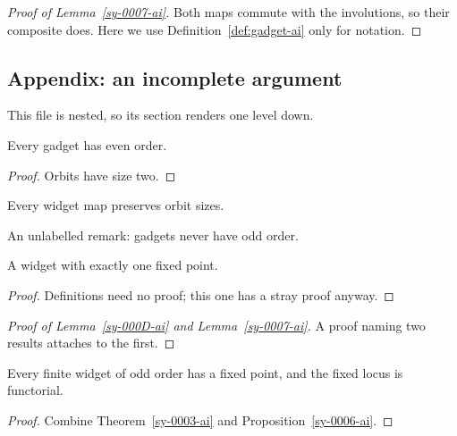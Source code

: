 \begin{proof}[Proof of Lemma~\ref{sy-0007-ai}]
Both maps commute with the involutions, so their composite does. Here we use Definition~\ref{def:gadget-ai} only for notation.
\end{proof}



\subsection{Appendix: an incomplete argument}\label{sy-0300-ai}

This file is nested, so its section renders one level down.

\begin{lemma}[Incomplete]\label{sy-000C-ai}
Every gadget has even order.
\end{lemma}
\begin{proof}
Orbits have size two. 
\end{proof}

\begin{lemma}\label{sy-000D-ai}
Every widget map preserves orbit sizes.
\end{lemma}

\begin{remark}
An unlabelled remark: gadgets never have odd order.
\end{remark}

\begin{definition}\label{sy-000E-ai}
A widget with exactly one fixed point.
\end{definition}
\begin{proof}
Definitions need no proof; this one has a stray proof anyway.
\end{proof}


\begin{proof}[Proof of Lemma~\ref{sy-000D-ai} and Lemma~\ref{sy-0007-ai}]
A proof naming two results attaches to the first.
\end{proof}

\begin{mainthm}\label{sy-000B-ai}
Every finite widget of odd order has a fixed point, and the fixed locus is functorial.
\end{mainthm}
\begin{proof}
Combine Theorem~\ref{sy-0003-ai} and Proposition~\ref{sy-0006-ai}.
\end{proof}






